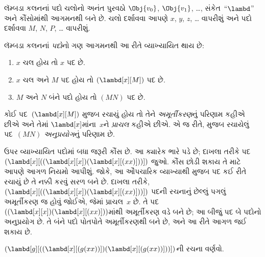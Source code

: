 \OLEndChapterHook
\endgroup


\begingroup
\makeatletter{}\makeatother

\label{guunit:OLP-0356}


\begingroup
\makeatletter{}\makeatother

\label{guunit:OLP-0357}


લૅમ્બડા કલનનાં પદો ચલોનો અનંત પુરવઠો $\Obj{v_0}$, $\Obj{v_1}$,
\dots{}, સંકેત~``$\lambd$'' અને કૌંસોમાંથી આગમનથી બને છે. ચલો
દર્શાવવા આપણે $x$, $y$, $z$, \dots{} વાપરીશું અને પદો દર્શાવવા
$M$, $N$, $P$, \dots{} વાપરીશું.

\begin{defn}[પદો] 
લૅમ્બડા કલનનાં \emph{પદો}નો ગણ આગમનથી આ રીતે વ્યાખ્યાયિત થાય છે:
\begin{enumerate}
  \item {} $x$ ચલ હોય તો $x$ પદ છે.
  \item {} $x$ ચલ અને $M$ પદ હોય તો
    $(\lambd[x][M])$ પદ છે.
  \item {} $M$ અને $N$ બંને પદો હોય તો
    $(MN)$ પદ છે.
\end{enumerate}
\end{defn}

કોઈ પદ~$(\lambd[x][M])$  મુજબ રચાયું હોય
તો તેને \emph{અમૂર્તીકરણ}નું પરિણામ કહીએ છીએ અને તેમાં
$\lambd[x]$માંના~$x$ને \emph{પ્રાચલ} કહીએ છીએ. એ જ રીતે,
 મુજબ રચાયેલું પદ~$(MN)$
\emph{અનુપ્રયોગ}નું પરિણામ છે.

ઉપર વ્યાખ્યાયિત પદોમાં બધા જરૂરી કૌંસ છે. આ ક્યારેક ભારે પડે છે;
દાખલા તરીકે પદ
$(\lambd[x][((\lambd[x][x])(\lambd[x][(xx)]))])$ જુઓ. કૌંસ
છોડી શકાય તે માટે આપણે આગળ નિયમો આપીશું. જોકે, આ ઔપચારિક
વ્યાખ્યાથી  મુજબ પદ કઈ રીતે રચાયું છે તે નક્કી
કરવું સરળ બને છે. દાખલા તરીકે,
$(\lambd[x][((\lambd[x][x])(\lambd[x][(xx)]))])$ પદની રચનાનું
છેલ્લું પગલું અમૂર્તીકરણ જ હોવું જોઈએ, જેમાં પ્રાચલ~$x$ છે.
તે પદ~$((\lambd[x][x])(\lambd[x][(xx)]))$માંથી અમૂર્તીકરણ વડે
બને છે; આ બીજું પદ બે પદોનો અનુપ્રયોગ છે. તે બંને પદો પોતપોતે
અમૂર્તીકરણથી બને છે, અને આ રીતે આગળ જઈ શકાય છે.

\begin{prob}
$(\lambd[g][((\lambd[x][(g (x x))])
  (\lambd[x][(g (x x))]))])$ની રચના વર્ણવો.
\end{prob}
\endgroup


